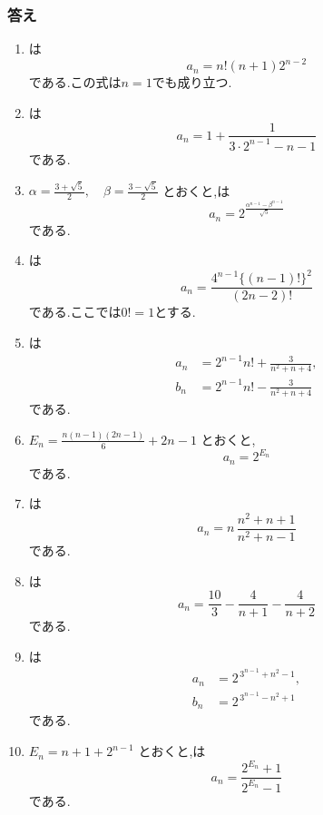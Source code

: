 \subsubsection{答え}\label{節：応用：答え}
\begin{enumerate}[label=\textbf{問\arabic*.},leftmargin=3.8em,format=\bookitemlink{practice-advanced}{answer}{solution}]
  \item {}は
    \[
      a_n=n!(n+1)2^{n-2}
    \]
    である.この式は$n=1$でも成り立つ.
  \item {}は
    \[
      a_n
      =1+\frac{1}{3\cdot2^{n-1}-n-1}
    \]
    である.
  \item $\alpha=\frac{3+\sqrt5}{2},\quad
      \beta=\frac{3-\sqrt5}{2}$
    とおくと,は
    \[
      a_n=2^{\frac{\alpha^{n-1}-\beta^{n-1}}{\sqrt5}}
    \]
    である.
  \item {}は
    \[
      a_n
      =\frac{4^{n-1}\{(n-1)!\}^2}{(2n-2)!}
    \]
    である.ここでは$0!=1$とする.
  \item {}は
    \begin{align*}
      a_n&=2^{n-1}n!+\frac3{n^2+n+4},\\
      b_n&=2^{n-1}n!-\frac3{n^2+n+4}
    \end{align*}
    である.
  \item $E_n=\frac{n(n-1)(2n-1)}6+2n-1$
    とおくと,
    \[
      a_n=2^{E_n}
    \]
    である.
  \item {}は
    \[
      a_n
      =n\,\frac{n^2+n+1}{n^2+n-1}
    \]
    である.
  \item {}は
    \[
      a_n
      =\frac{10}{3}-\frac4{n+1}-\frac4{n+2}
    \]
    である.
  \item {}は
    \begin{align*}
      a_n&=2^{\,3^{n-1}+n^2-1},\\
      b_n&=2^{\,3^{n-1}-n^2+1}
    \end{align*}
    である.
  \item $E_n=n+1+2^{n-1}$ とおくと,は
    \[
      a_n=\frac{2^{E_n}+1}{2^{E_n}-1}
    \]
    である.
\end{enumerate}

